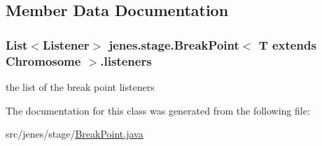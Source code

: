 \subsection{Member Data Documentation}
\hypertarget{classjenes_1_1stage_1_1_break_point_3_01_t_01extends_01_chromosome_01_4_a63fa2b0e419a40565240722068e83a68}{
\subsubsection[{listeners}]{\setlength{\rightskip}{0pt plus 5cm}List$<$Listener$>$ jenes.\-stage.\-Break\-Point$<$ T extends Chromosome $>$.listeners\hspace{0.3cm}{\ttfamily [private]}}}\label{classjenes_1_1stage_1_1_break_point_3_01_t_01extends_01_chromosome_01_4_a63fa2b0e419a40565240722068e83a68}
the list of the break point listeners 

The documentation for this class was generated from the following file\-:\begin{DoxyCompactItemize}
\item 
src/jenes/stage/\hyperlink{_break_point_8java}{Break\-Point.\-java}\end{DoxyCompactItemize}
